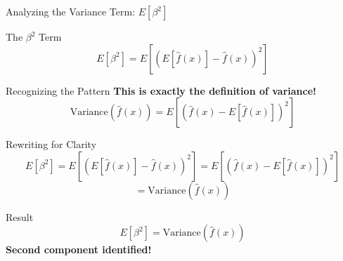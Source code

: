 \documentclass[10pt]{beamer}
\begin{document}
\begin{frame}{Analyzing the Variance Term: $E[\beta^2]$}
\begin{definitionbox}{The $\beta^2$ Term}
$$E[\beta^2] = E[(E[\hat{f}(x)] - \hat{f}(x))^2]$$
\end{definitionbox}

\begin{keypointsbox}{Recognizing the Pattern}
\textbf{This is exactly the definition of variance!}
$$\text{Variance}(\hat{f}(x)) = E[(\hat{f}(x) - E[\hat{f}(x)])^2]$$
\end{keypointsbox}

\begin{examplebox}{Rewriting for Clarity}
$$E[\beta^2] = E[(E[\hat{f}(x)] - \hat{f}(x))^2] = E[(\hat{f}(x) - E[\hat{f}(x)])^2]$$
$$= \text{Variance}(\hat{f}(x))$$
\end{examplebox}

\begin{alertbox}{Result}
$$\boxed{E[\beta^2] = \text{Variance}(\hat{f}(x))}$$
\textbf{Second component identified!}
\end{alertbox}
\end{frame}
\end{document}
